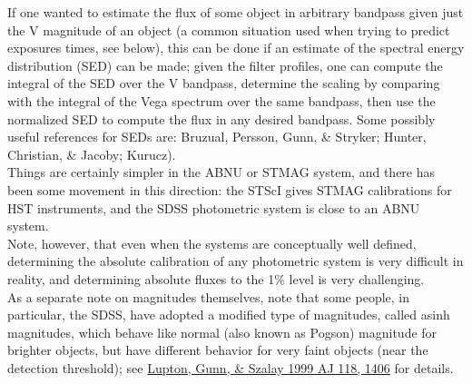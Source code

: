 \documentclass[12pt]{article}
\begin{document}
\noindent If one wanted to estimate the flux of some object in
arbitrary bandpass given just the V magnitude of an object (a common
situation used when trying to predict exposures times, see below),
this can be done if an estimate of the spectral energy distribution
(SED) can be made; given the filter profiles, one can compute the
integral of the SED over the V bandpass, determine the scaling by
comparing with the integral of the Vega spectrum over the same
bandpass, then use the normalized SED to compute the flux in any
desired bandpass. Some possibly useful references for SEDs are:
Bruzual, Persson, Gunn, \& Stryker; Hunter, Christian, \& Jacoby;
Kurucz).\\

\noindent Things are certainly simpler in the ABNU or STMAG system, and
there has been some movement in this direction: the STScI gives STMAG
calibrations for HST instruments, and the SDSS photometric system is
close to an ABNU system.\\

\noindent Note, however, that even when the systems are conceptually
well defined, determining the absolute calibration of any photometric
system is very difficult in reality, and determining absolute fluxes
to the 1\% level is very challenging.\\

\noindent As a separate note on magnitudes themselves, note that some
people, in particular, the SDSS, have adopted a modified type of
magnitudes, called asinh magnitudes, which behave like normal (also
known as Pogson) magnitude for brighter objects, but have different
behavior for very faint objects (near the detection threshold); see
\href{http://adsabs.harvard.edu/abs/1999AJ....118.1406L}
{Lupton, Gunn, \& Szalay 1999 AJ 118, 1406} for details.
\end{document}
